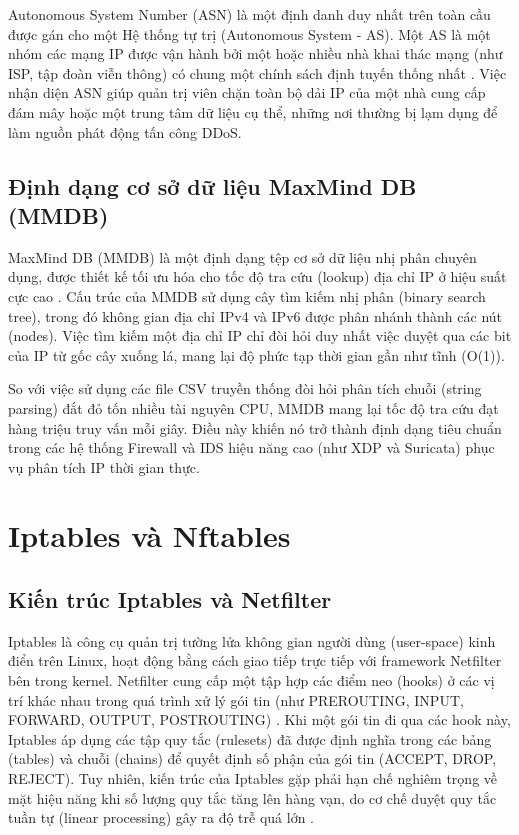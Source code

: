 \documentclass[../DoAn.tex]{subfiles}
\begin{document}
Autonomous System Number (ASN) là một định danh duy nhất trên toàn cầu được gán cho một Hệ thống tự trị (Autonomous System - AS). Một AS là một nhóm các mạng IP được vận hành bởi một hoặc nhiều nhà khai thác mạng (như ISP, tập đoàn viễn thông) có chung một chính sách định tuyến thống nhất \cite{kurose2017computer}. Việc nhận diện ASN giúp quản trị viên chặn toàn bộ dải IP của một nhà cung cấp đám mây hoặc một trung tâm dữ liệu cụ thể, những nơi thường bị lạm dụng để làm nguồn phát động tấn công DDoS.

\subsection{Định dạng cơ sở dữ liệu MaxMind DB (MMDB)}
MaxMind DB (MMDB) là một định dạng tệp cơ sở dữ liệu nhị phân chuyên dụng, được thiết kế tối ưu hóa cho tốc độ tra cứu (lookup) địa chỉ IP ở hiệu suất cực cao \cite{maxmind2025mmdb}. Cấu trúc của MMDB sử dụng cây tìm kiếm nhị phân (binary search tree), trong đó không gian địa chỉ IPv4 và IPv6 được phân nhánh thành các nút (nodes). Việc tìm kiếm một địa chỉ IP chỉ đòi hỏi duy nhất việc duyệt qua các bit của IP từ gốc cây xuống lá, mang lại độ phức tạp thời gian gần như tĩnh (O(1)).

So với việc sử dụng các file CSV truyền thống đòi hỏi phân tích chuỗi (string parsing) đắt đỏ tốn nhiều tài nguyên CPU, MMDB mang lại tốc độ tra cứu đạt hàng triệu truy vấn mỗi giây. Điều này khiến nó trở thành định dạng tiêu chuẩn trong các hệ thống Firewall và IDS hiệu năng cao (như XDP và Suricata) phục vụ phân tích IP thời gian thực.

\section{Iptables và Nftables}
\subsection{Kiến trúc Iptables và Netfilter}
Iptables là công cụ quản trị tường lửa không gian người dùng (user-space) kinh điển trên Linux, hoạt động bằng cách giao tiếp trực tiếp với framework Netfilter bên trong kernel. Netfilter cung cấp một tập hợp các điểm neo (hooks) ở các vị trí khác nhau trong quá trình xử lý gói tin (như PREROUTING, INPUT, FORWARD, OUTPUT, POSTROUTING) \cite{benvenuti2005linux}. Khi một gói tin đi qua các hook này, Iptables áp dụng các tập quy tắc (rulesets) đã được định nghĩa trong các bảng (tables) và chuỗi (chains) để quyết định số phận của gói tin (ACCEPT, DROP, REJECT). Tuy nhiên, kiến trúc của Iptables gặp phải hạn chế nghiêm trọng về mặt hiệu năng khi số lượng quy tắc tăng lên hàng vạn, do cơ chế duyệt quy tắc tuần tự (linear processing) gây ra độ trễ quá lớn \cite{benvenuti2005linux}.
\end{document}
